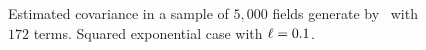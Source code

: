 \begin{figure}[H]
 \centering
 \caption{Estimated covariance in a sample of $5,000$ fields generate by \kle\ with $172$ terms. Squared exponential case with $\ell = 0.1$.}
 \label{covar_sexpKL_96}
\end{figure}
